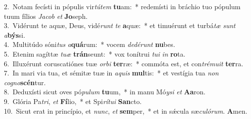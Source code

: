 {2.~}Notam fecísti in pópulis vir\textit{tú}\textit{tem} \textbf{tu}am:~* redemísti in bráchio tuo pópulum tuum fílios \textit{Ja}\textit{cob} \textit{et} \textbf{Jo}seph.\\
{3.~}Vidérunt te aquæ, Deus, vidé\textit{runt} \textit{te} \textbf{a}quæ:~* et timuérunt et turbá\textit{tæ} \textit{sunt} \textit{a}\textbf{býs}si.\\
{4.~}Multitúdo sóni\textit{tus} \textit{a}\textbf{quá}rum:~* vocem \textit{de}\textit{dé}\textit{runt} \textbf{nu}bes.\\
{5.~}Etenim sagíttæ \textit{tu}\textit{æ} \textbf{trán}seunt:~* vox tonítrui \textit{tu}\textit{i} \textit{in} \textbf{ro}ta.\\
{6.~}Illuxérunt coruscatiónes tuæ \textit{or}\textit{bi} \textbf{ter}ræ:~* commóta est, et con\textit{tré}\textit{mu}\textit{it} \textbf{ter}ra.\\
{7.~}In mari via tua, et sémitæ tuæ in \textit{a}\textit{quis} \textbf{mul}tis:~* et vestígia tua \textit{non} \textit{co}\textit{gno}\textbf{scén}tur.\\
{8.~}Deduxísti sicut oves pó\textit{pu}\textit{lum} \textbf{tu}um,~* in manu Mó\textit{y}\textit{si} \textit{et} \textbf{A}\textbf{a}ron.\\
{9.~}Glória Pa\textit{tri}, \textit{et} \textbf{Fí}lio,~* et Spi\textit{rí}\textit{tu}\textit{i} \textbf{San}cto.\\
{10.~}Sicut erat in princípio, et \textit{nunc}, \textit{et} \textbf{sem}per,~* et in sǽcula sæ\textit{cu}\textit{ló}\textit{rum}. \textbf{A}men.\\

